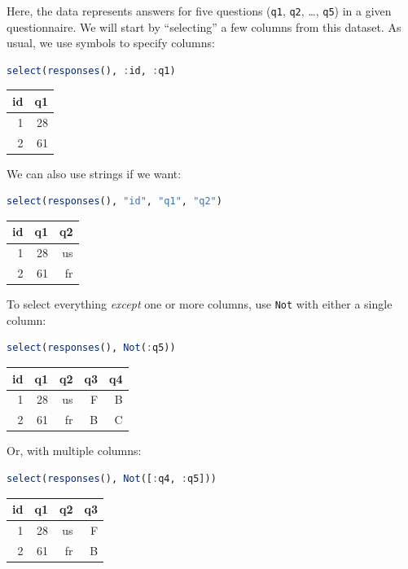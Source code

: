 \documentclass[
  notoc %
]{tufte-book}
\newcommand{\passthrough}[1]{#1}
\begin{document}
Here, the data represents answers for five questions
(\passthrough{\lstinline!q1!}, \passthrough{\lstinline!q2!}, \ldots,
\passthrough{\lstinline!q5!}) in a given questionnaire. We will start by
``selecting'' a few columns from this dataset. As usual, we use symbols
to specify columns:

\begin{lstlisting}[language=Julia]
select(responses(), :id, :q1)
\end{lstlisting}

\begin{longtable}[]{@{}rr@{}}
\toprule
id & q1 \\
\midrule
\endhead
1 & 28 \\
2 & 61 \\
\bottomrule
\end{longtable}

We can also use strings if we want:

\begin{lstlisting}[language=Julia]
select(responses(), "id", "q1", "q2")
\end{lstlisting}

\begin{longtable}[]{@{}rrr@{}}
\toprule
id & q1 & q2 \\
\midrule
\endhead
1 & 28 & us \\
2 & 61 & fr \\
\bottomrule
\end{longtable}

To select everything \emph{except} one or more columns, use
\passthrough{\lstinline!Not!} with either a single column:

\begin{lstlisting}[language=Julia]
select(responses(), Not(:q5))
\end{lstlisting}

\begin{longtable}[]{@{}rrrrr@{}}
\toprule
id & q1 & q2 & q3 & q4 \\
\midrule
\endhead
1 & 28 & us & F & B \\
2 & 61 & fr & B & C \\
\bottomrule
\end{longtable}

Or, with multiple columns:

\begin{lstlisting}[language=Julia]
select(responses(), Not([:q4, :q5]))
\end{lstlisting}

\begin{longtable}[]{@{}rrrr@{}}
\toprule
id & q1 & q2 & q3 \\
\midrule
\endhead
1 & 28 & us & F \\
2 & 61 & fr & B \\
\bottomrule
\end{longtable}
\end{document}
